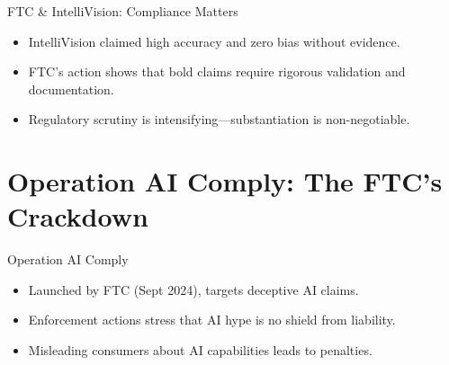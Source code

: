 \documentclass[aspectratio=169]{beamer}
\begin{document}
\begin{frame}{FTC \& IntelliVision: Compliance Matters}
\begin{itemize}
\item IntelliVision claimed high accuracy and zero bias without evidence.
\item FTC’s action shows that bold claims require rigorous validation and documentation.
\item Regulatory scrutiny is intensifying—substantiation is non-negotiable.
\end{itemize}
\end{frame}

\section{Operation AI Comply: The FTC’s Crackdown}

\begin{frame}{Operation AI Comply}
\begin{itemize}
\item Launched by FTC (Sept 2024), targets deceptive AI claims.
\item Enforcement actions stress that AI hype is no shield from liability.
\item Misleading consumers about AI capabilities leads to penalties.
\end{itemize}
\end{frame}
\end{document}
